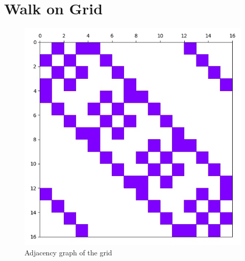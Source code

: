 \section{Walk on Grid}


\begin{figure}[H]
\centering
\includegraphics[width=0.5\linewidth]{./figures/results/grid/graph.jpg}
\caption{Adjacency graph of the grid}
\end{figure}

